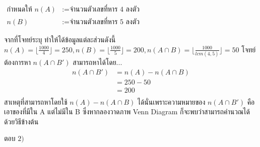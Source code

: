 \documentclass[11pt]{scrartcl}
\begin{document}
\begin{solutionbox}
  \begin{flushleft}
  $\begin{aligned}
    \text{กำหนดให้ } n(A) &:= \text{จำนวนตัวเลขที่หาร 4 ลงตัว} \\
    n(B) &:= \text{จำนวนตัวเลขที่หาร 5 ลงตัว}
  \end{aligned}$
  \end{flushleft}

  จากที่โจทย์ระบุ ทำให้ได้ข้อมูลแต่ละส่วนดังนี้ $n(A) = \lfloor \frac{1000}{4} \rfloor = 250, n(B) = \lfloor \frac{1000}{5} \rfloor = 200, n(A \cap B) = \lfloor \frac{1000}{lcm(4, 5)} \rfloor = 50$ โจทย์ต้องการหา $n(A \cap B')$ สามารถหาได้โดย...
  \begin{align*}
    n(A \cap B') &= n(A) - n(A \cap B) \\
                  &= 250 - 50 \\
                  &= 200 \\
  \end{align*}
  สาเหตุที่สามารถหาโดยใช้ $n(A) - n(A \cap B)$ ได้นั่นเพราะความหมายของ $n(A \cap B')$ คือเอาของที่มีใน A แต่ไม่มีใน B ซึ่งหากลองวาดภาพ Venn Diagram ก็จะพบว่าสามารถคำนวณได้ด้วยวิธีข้างต้น

  \begin{center}
  \end{center}

  ตอบ $\boxed{2)}$
\end{solutionbox}
\end{document}
